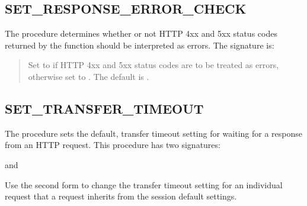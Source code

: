 \documentclass[letterpaper,10pt,english,openany,oneside]{sphinxmanual}
\begin{document}
\subsection{SET\_RESPONSE\_ERROR\_CHECK}
\label{\detokenize{utl_http:set-response-error-check}}
The  procedure determines whether or not HTTP
4xx and 5xx status codes returned by the  function should
be interpreted as errors. The signature is:
\begin{quote}

\end{quote}


\begin{quote}

Set  to  if HTTP 4xx and 5xx status codes are to be
treated as errors, otherwise set to . The default is .
\end{quote}


\subsection{SET\_TRANSFER\_TIMEOUT}
\label{\detokenize{utl_http:set-transfer-timeout}}
The  procedure sets the default, transfer timeout
setting for waiting for a response from an HTTP request. This procedure
has two signatures:
\begin{quote}

\end{quote}

and
\begin{quote}

\end{quote}

Use the second form to change the transfer timeout setting for an
individual request that a request inherits from the session default
settings.

\newpage
\end{document}
